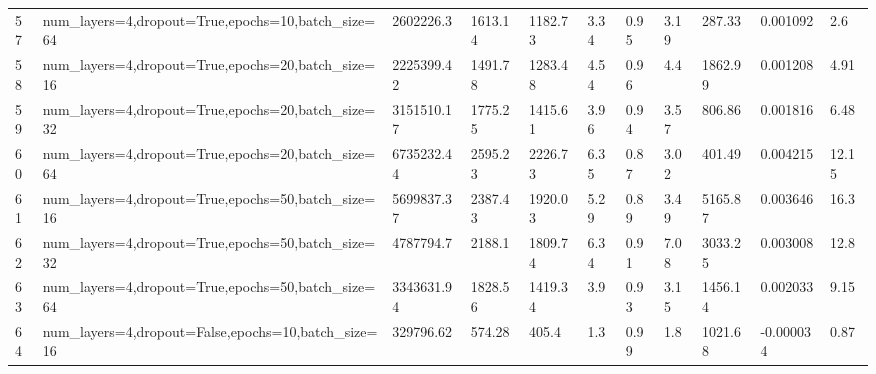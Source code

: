 \begin{longtable}{C{0.8cm} L{2cm} C{1.15cm} C{1.15cm} C{1.15cm} C{1.15cm} C{0.85cm} C{1.25cm} C{1.2cm} C{1.5cm} C{1.0cm}}
57 & num\_layers=4,\newline dropout=True,\newline epochs=10,\newline batch\_size=64 & 2602226.3 & 1613.14 & 1182.73 & 3.34 & 0.95 & 3.19 & 287.33 & 0.001092 & 2.6 \\
58 & num\_layers=4,\newline dropout=True,\newline epochs=20,\newline batch\_size=16 & 2225399.42 & 1491.78 & 1283.48 & 4.54 & 0.96 & 4.4 & 1862.99 & 0.001208 & 4.91 \\
59 & num\_layers=4,\newline dropout=True,\newline epochs=20,\newline batch\_size=32 & 3151510.17 & 1775.25 & 1415.61 & 3.96 & 0.94 & 3.57 & 806.86 & 0.001816 & 6.48 \\
60 & num\_layers=4,\newline dropout=True,\newline epochs=20,\newline batch\_size=64 & 6735232.44 & 2595.23 & 2226.73 & 6.35 & 0.87 & 3.02 & 401.49 & 0.004215 & 12.15 \\
61 & num\_layers=4,\newline dropout=True,\newline epochs=50,\newline batch\_size=16 & 5699837.37 & 2387.43 & 1920.03 & 5.29 & 0.89 & 3.49 & 5165.87 & 0.003646 & 16.3 \\
62 & num\_layers=4,\newline dropout=True,\newline epochs=50,\newline batch\_size=32 & 4787794.7 & 2188.1 & 1809.74 & 6.34 & 0.91 & 7.08 & 3033.25 & 0.003008 & 12.8 \\
63 & num\_layers=4,\newline dropout=True,\newline epochs=50,\newline batch\_size=64 & 3343631.94 & 1828.56 & 1419.34 & 3.9 & 0.93 & 3.15 & 1456.14 & 0.002033 & 9.15 \\
64 & num\_layers=4,\newline dropout=False,\newline epochs=10,\newline batch\_size=16 & 329796.62 & 574.28 & 405.4 & 1.3 & 0.99 & 1.8 & 1021.68 & -0.000034 & 0.87 \\

\end{longtable}
